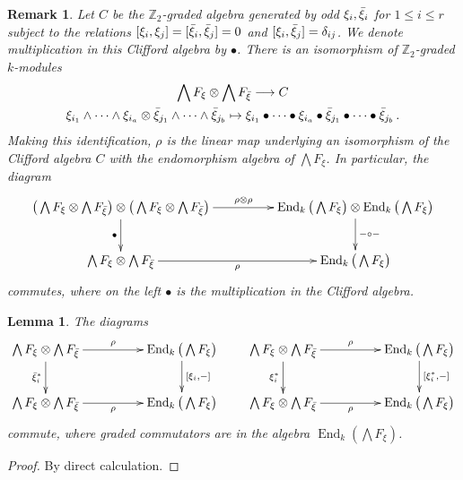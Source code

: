 \documentclass[english,letter paper,12pt,leqno]{article}
\newtheorem{lemma}[theorem]{Lemma}
\theoremstyle{example}
\newtheorem{remark}[theorem]{Remark}
\numberwithin{equation}{section}
\def\be{\begin{equation}}
\def\ee{\end{equation}}
\def\nZ{\mathds{Z}}
\DeclareMathOperator{\End}{End}
\begin{document}
\begin{remark}\label{remark_rhoisoalg} Let $C$ be the $\nZ_2$-graded algebra generated by odd $\xi_i, \Bar{\xi}_i$ for $1 \le i \le r$ subject to the relations $[ \xi_i, \xi_j ] = [ \Bar{\xi}_i, \Bar{\xi}_j ] = 0$ and $[ \xi_i, \Bar{\xi}_j ] = \delta_{ij}$. We denote multiplication in this Clifford algebra by $\bullet$. There is an isomorphism of $\nZ_2$-graded $k$-modules
\begin{gather*}
\bigwedge F_\xi \otimes \bigwedge F_{\Bar{\xi}} \longrightarrow C\\
\xi_{i_1} \wedge \cdots \wedge \xi_{i_a} \otimes \Bar{\xi}_{j_1} \wedge \cdots \wedge \Bar{\xi}_{j_b} \mapsto \xi_{i_1} \bullet \cdots \bullet \xi_{i_a} \bullet \Bar{\xi}_{j_1} \bullet \cdots \bullet \Bar{\xi}_{j_b}\,.
\end{gather*}
Making this identification, $\rho$ is the linear map underlying an isomorphism of the Clifford algebra $C$ with the endomorphism algebra of $\bigwedge F_\xi$. In particular, the diagram
\be
\xymatrix@C+2pc{
\big( \bigwedge F_\xi \otimes \bigwedge F_{\Bar{\xi}} \big) \otimes \big( \bigwedge F_\xi \otimes \bigwedge F_{\Bar{\xi}} \big) \ar[r]^-{\rho \otimes \rho}\ar[d]_-\bullet & \End_k\big( \bigwedge F_\xi\big) \otimes \End_k\big( \bigwedge F_\xi \big) \ar[d]^-{- \circ -}\\
\bigwedge F_\xi \otimes \bigwedge F_{\Bar{\xi}} \ar[r]_-\rho & \End_k\big( \bigwedge F_\xi \big)
}
\ee
commutes, where on the left $\bullet$ is the multiplication in the Clifford algebra.
\end{remark}

\begin{lemma}\label{lemma:commutators_on_rho} The diagrams
\[
\xymatrix@C+2pc{
\bigwedge F_\xi \otimes \bigwedge F_{\Bar{\xi}} \ar[d]_-{\Bar{\xi}_i^*} \ar[r]^-{\rho} & \End_k\big( \bigwedge F_\xi \big) \ar[d]^-{[\xi_i, -]}\\
\bigwedge F_\xi \otimes \bigwedge F_{\Bar{\xi}} \ar[r]_-{\rho} & \End_k\big( \bigwedge F_\xi \big)
}
\qquad
\xymatrix@C+2pc{
\bigwedge F_\xi \otimes \bigwedge F_{\Bar{\xi}} \ar[d]_-{\xi_i^*} \ar[r]^-{\rho} & \End_k\big( \bigwedge F_\xi \big) \ar[d]^-{[ \xi_i^*, - ]}\\
\bigwedge F_\xi \otimes \bigwedge F_{\Bar{\xi}} \ar[r]_-{\rho} & \End_k\big( \bigwedge F_\xi \big)
}
\]
commute, where graded commutators are in the algebra $\End_k(\bigwedge F_\xi)$.
\end{lemma}
\begin{proof}
By direct calculation.
\end{proof}
\end{document}
